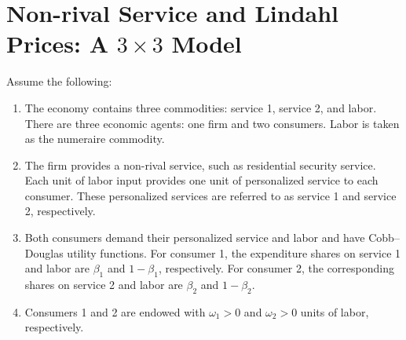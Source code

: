 \documentclass[
  letterpaper,
  DIV=11,
  numbers=noendperiod]{scrreprt}
\newenvironment{Shaded}{\begin{snugshade}}{\end{snugshade}}
\newcommand{\ConstantTok}[1]{\textcolor[rgb]{0.56,0.35,0.01}{#1}}
\newcommand{\FloatTok}[1]{\textcolor[rgb]{0.68,0.00,0.00}{#1}}
\newcommand{\FunctionTok}[1]{\textcolor[rgb]{0.28,0.35,0.67}{#1}}
\newcommand{\NormalTok}[1]{\textcolor[rgb]{0.00,0.23,0.31}{#1}}
\newcommand{\OperatorTok}[1]{\textcolor[rgb]{0.37,0.37,0.37}{#1}}
\begin{document}
%

\section{\texorpdfstring{Non-rival Service and Lindahl Prices: A
\(3\times3\)
Model}{Non-rival Service and Lindahl Prices: A 3\textbackslash times3 Model}}\label{non-rival-service-and-lindahl-prices-a-3times3-model}

Assume the following:

\begin{enumerate}
\def\labelenumi{\arabic{enumi}.}
\item
  The economy contains three commodities: service 1, service 2, and
  labor. There are three economic agents: one firm and two consumers.
  Labor is taken as the numeraire commodity.
\item
  The firm provides a non-rival service, such as residential security
  service. Each unit of labor input provides one unit of personalized
  service to each consumer. These personalized services are referred to
  as service 1 and service 2, respectively.
\item
  Both consumers demand their personalized service and labor and have
  Cobb--Douglas utility functions. For consumer 1, the expenditure
  shares on service 1 and labor are \(\beta_1\) and \(1-\beta_1\),
  respectively. For consumer 2, the corresponding shares on service 2
  and labor are \(\beta_2\) and \(1-\beta_2\).
\item
  Consumers 1 and 2 are endowed with \(\omega_1>0\) and \(\omega_2>0\)
  units of labor, respectively.
\end{enumerate}
\end{document}
